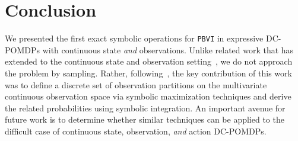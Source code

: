\documentclass{article} %
\begin{document}
\section{Conclusion} 
%
%
We presented the first exact symbolic operations for \texttt{PBVI} in
expressive DC-POMDPs with continuous state \emph{and} observations.
Unlike related work that has extended to the continuous state and
observation setting~\cite{Perseus_cont}, we do not approach the
problem by sampling.  Rather, following~\cite{pascal_ijcai05}, the key
contribution of this work was to define a discrete set of observation
partitions on the multivariate continuous observation space via
symbolic maximization techniques and derive the related probabilities
using symbolic integration.  An important avenue for future work is to
determine whether similar techniques can be applied to the difficult
case of continuous state, observation, \emph{and} action DC-POMDPs.



\end{document}
